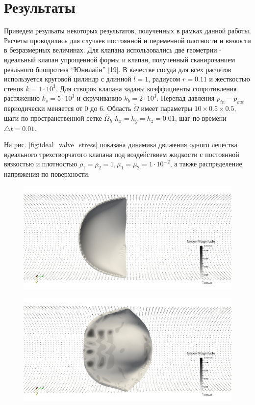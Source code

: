\section{Результаты}\label{ux440ux435ux437ux443ux43bux44cux442ux430ux442ux44b}

Приведем резульаты некоторых результатов, полученных в рамках данной
работы. Расчеты проводились для случаев постоянной и переменной
плотности и вязкости в безразмерных величинах. Для клапана
использовались две геометрии - идеальный клапан упрощенной формы и
клапан, полученный сканированием реального биопротеза ``Юнилайн''
{[}19{]}. В качестве сосуда для всех расчетов используется круговой
цилиндр с длинной \(l=1\), радиусом \(r=0.11\) и жесткостью стенок
\(k=1 \cdot 10^{3}\). Для створок клапана заданы коэффициенты
сопротивления растяжению \(k_s = 5 \cdot 10^{3}\) и скручиванию
\(k_b = 2 \cdot 10^{3}\). Перепад давления \(p_{in} - p_{out}\)
периодически меняется от 0 до 6. Область \(\tilde{\Omega}\) имеет
параметры \(10 \times 0.5 \times 0.5\), шаги по пространственной сетке
\(\tilde{\Omega_h}\) \(h_x = h_y = h_z = 0.01\), шаг по времени
\(\triangle t = 0.01\).

На рис. \ref{fig:ideal_valve_stress} показана динамика движения одного
лепестка идеального трехстворчатого клапана под воздействием жидкости с
постоянной вязкостью и плотностью
\(\rho_1=\rho_2=1, \mu_1=\mu_2=1 \cdot 10^{-2}\), а также распределение
напряжения по поверхности.

\begin{figure}[htbp]
\centering
\includegraphics{ideal_valve_stress_1.png}
\caption{}
\end{figure}

\begin{figure}[htbp]
\centering
\includegraphics{ideal_valve_stress_2.png}
\caption{}
\end{figure}


